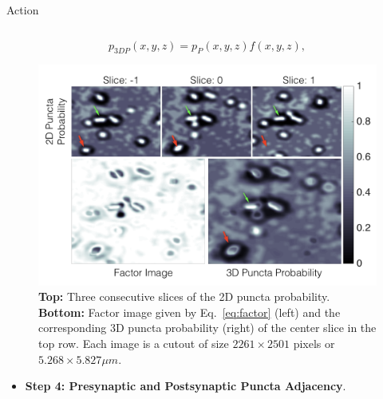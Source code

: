 \documentclass[final, table]{beamer}
\newlength{\onecolwid}
\newlength{\twocolwid}
\begin{document}
\begin{frame}[t]
\begin{columns}[t]
\begin{column}{\twocolwid}
\begin{block}{Action}
\begin{columns}[t]
\begin{column}{\onecolwid}
\begin{equation}
p_{3DP}(x,y,z)= p_P(x,y,z) f(x,y,z),
\label{eq:p3dp} 
\end{equation}
\vspace{1cm}

\begin{figure}
\includegraphics[width=1\textwidth]{figs/factor_result}
\caption{\textbf{Top:} Three consecutive slices of the 2D puncta probability. \textbf{Bottom:} Factor image given by Eq.~\eqref{eq:factor} (left) and the corresponding 3D puncta probability (right) of the center slice in the top row. Each image is a cutout of size $2261 \times 2501$ pixels or $5.268 \times 5.827 \mu m$.}
\label{fig:factor_result}
\end{figure}

\vspace{1cm}
\begin{itemize} 
\item \textbf{Step 4: Presynaptic and Postsynaptic Puncta Adjacency}.  %
\end{itemize} 


\end{column}
\end{columns}
\end{block}
\end{column}
\end{columns}
\end{frame}
\end{document}

